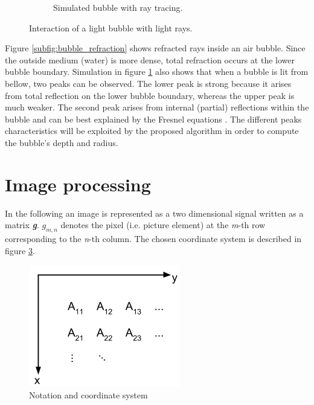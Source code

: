\begin{figure}
\begin{subfigure}[t]{0.5\textwidth}
		        \caption{Simulated bubble with ray tracing.}	
		        \label{subfig:bubble_simulation}
		    \end{subfigure}
		    
		    \caption{Interaction of a light bubble with light rays.}
		    \label{fig:bubble_physics}
	 		\end{figure}	
			
			Figure \ref{subfig:bubble_refraction} shows refracted rays inside an air bubble. Since the outside medium (water) is more dense, total refraction occurs at the lower bubble boundary. Simulation in figure \ref{subfig:bubble_simulation} also shows that when a bubble is lit from bellow, two peaks can be observed. The lower peak is strong because it arises from total reflection on the lower bubble boundary, whereas the upper peak is much weaker. The second peak arises from internal (partial) reflections within the bubble and can be best explained by the Fresnel equations \citep{Demtroeder2}. 
			The different peaks characteristics will be exploited by the proposed algorithm in order to compute the bubble's depth and radius.
			
			
	
	\section{Image processing}	\label{image_processing}
	In the following an image is represented as a two dimensional signal written as a matrix \textit{\textbf{g}}. $g_{m,n}$ denotes the pixel (i.e. picture element) at the \textit{m}-th row corresponding to the \textit{n}-th column. The chosen coordinate system is described in figure \ref{fig:coord_sys}. 
	
		\begin{figure}
		    \centering
		    \includegraphics[scale=0.4]{images/coord_sys.png}
		    \caption{Notation and coordinate system}
		    \label{fig:coord_sys}
		\end{figure}
	
